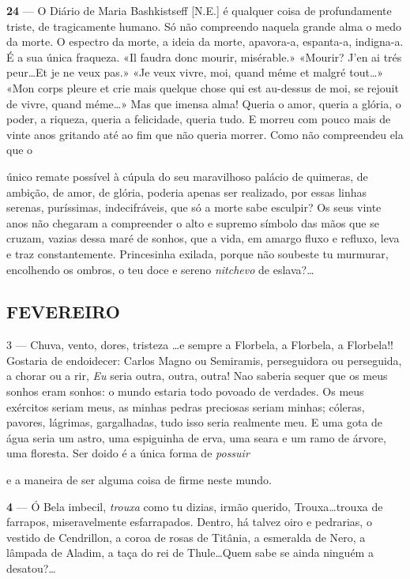 \textbf{24} — O Diário de Maria Bashkistseff [N.E.] é qualquer coisa
de profundamente triste, de tragicamente humano. Só
não compreendo naquela grande alma o medo da
morte. O espectro da morte, a ideia da morte, 
apavora-a, espanta-a, indigna-a. É a sua única fraqueza.
«Il faudra donc mourir, misérable.» «Mourir? J’en ai
trés peur\ldots Et je ne veux pas.» «Je veux vivre, moi,
quand méme et malgré tout\ldots» «Mon corps pleure et
crie mais quelque chose qui est au-dessus de moi, se
rejouit de vivre, quand méme\ldots» Mas que imensa
alma! Queria o amor, queria a glória, o poder, a
riqueza, queria a felicidade, queria tudo. E morreu com
pouco mais de vinte anos gritando até ao fim que
não queria morrer. Como não compreendeu ela que o

\pagebreak


único remate possível à cúpula do seu maravilhoso
palácio de quimeras, de ambição, de amor, de glória,
poderia apenas ser realizado, por essas linhas serenas,
puríssimas, indecifráveis, que só a morte sabe 
esculpir? Os seus vinte anos não chegaram a compreender
o alto e supremo símbolo das mãos que se cruzam,
vazias dessa maré de sonhos, que a vida, em amargo
fluxo e refluxo, leva e traz constantemente. 
Princesinha exilada, porque não soubeste tu murmurar, 
encolhendo os ombros, o teu doce e sereno \textit{nitchevo}
de eslava?\ldots

\subsection{FEVEREIRO}

3 — Chuva, vento, dores, tristeza \ldots e sempre a 
Florbela, a Florbela, a Florbela!! Gostaria de endoidecer:
Carlos Magno ou Semiramis, perseguidora ou 
perseguida, a chorar ou a rir, \textit{Eu} seria outra, outra, outra!
Nao saberia sequer que os meus sonhos eram sonhos:
o mundo estaria todo povoado de verdades. Os meus
exércitos seriam meus, as minhas pedras preciosas seriam
minhas; cóleras, pavores, lágrimas, gargalhadas, tudo isso
seria realmente meu. E uma gota de água seria um astro,
uma espiguinha de erva, uma seara e um ramo de 
árvore, uma floresta. Ser doido é a única forma de \textit{possuir}

\pagebreak


e a maneira de ser alguma coisa de firme neste
mundo.

\textbf{4} — Ó Bela imbecil, \textit{trouxa} como tu dizias, irmão
querido, Trouxa\ldots trouxa de farrapos, miseravelmente
esfarrapados. Dentro, há talvez oiro e pedrarias, o
vestido de Cendrillon, a coroa de rosas de Titânia,
a esmeralda de Nero, a lâmpada de Aladim, a taça
do rei de Thule\ldots Quem sabe se ainda ninguém a
desatou?\ldots

